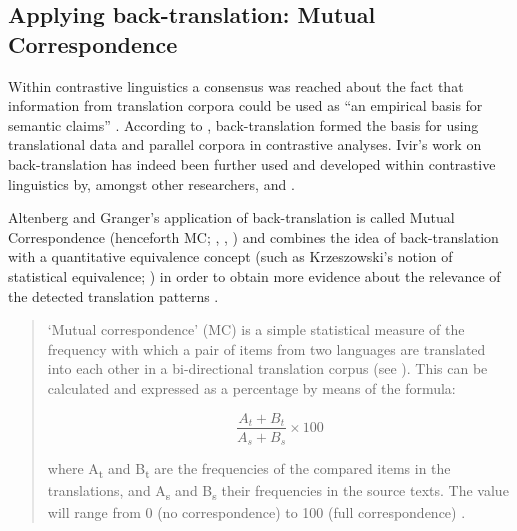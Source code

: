 \subsection{Applying back-translation: Mutual Correspondence}
\label{sec:2.3.3}  
Within contrastive linguistics a consensus was reached about the fact that information from translation corpora could be used as “an empirical basis for semantic claims” \citep[758]{noel_translations_2003}. According to \citet[24--28]{ebeling_patterns_2013}, back-translation formed the basis for using translational data and parallel corpora in contrastive analyses. Ivir’s work on back-translation has indeed been further used and developed within contrastive linguistics by, amongst other researchers, \citet{hasselgard_adverbial_1999} and \citet{altenberg_recent_2002}.

Altenberg and Granger’s application of back-translation is called Mutual Correspondence (henceforth MC; \citealp[254 ff.]{hasselgard_adverbial_1999}, \citealp[9]{altenberg_correspondence_2007}, \citealp[7--18]{altenberg_recent_2002}) and combines the idea of back-translation with a quantitative equivalence concept (such as Krzeszowski’s notion of statistical equivalence; \citealp[27--28]{krzeszowski_contrasting_1990}) in order to obtain more evidence about the relevance of the detected translation patterns \citep[17]{altenberg_recent_2002}.

\begin{quote}
‘Mutual correspondence’ (MC) is a simple statistical measure of the frequency with which a pair of items from two languages are translated into each other in a bi-directional translation corpus (see \citealt{hasselgard_adverbial_1999}). This can be calculated and expressed as a percentage by means of the formula:
	
$$\frac{A_t + B_t}{A_s + B_s} \times 100$$

where A\textsubscript{t} and B\textsubscript{t} are the frequencies of the compared items in the translations, and A\textsubscript{s} and B\textsubscript{s} their frequencies in the source texts. The value will range from 0 (no correspondence) to 100 (full correspondence) \citep[9]{altenberg_correspondence_2007}.
\end{quote}

